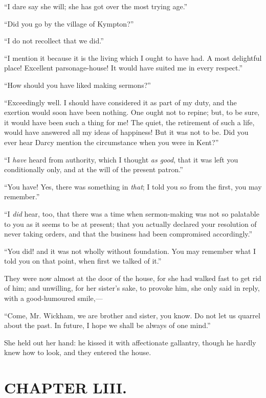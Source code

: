 ``I dare say she will; she has got over the most trying age.''

``Did you go by the village of Kympton?''

``I do not recollect that we did.''

``I mention it because it is the living which I ought to have had. A most delightful place! Excellent parsonage-house! It would have suited me in every respect.''

``How should you have liked making sermons?''

``Exceedingly well. I should have considered it as part of my duty, and the exertion would soon have been nothing. One ought not to repine; but, to be sure, it would have been such a thing for me! The quiet, the retirement of such a life, would have answered all my ideas of happiness! But it was not to be. Did you ever hear Darcy mention the circumstance when you were in Kent?''

``I \textit{have} heard from authority, which I thought \textit{as good}, that it was left you conditionally only, and at the will of the present patron.''

``You have! Yes, there was something in \textit{that}; I told you so from the first, you may remember.''

``I \textit{did} hear, too, that there was a time when sermon-making was not so palatable to you as it seems to be at present; that you actually declared your resolution of never taking orders, and that the business had been compromised accordingly.''

``You did! and it was not wholly without foundation. You may remember what I told you on that point, when first we talked of it.''

They were now almost at the door of the house, for she had walked fast to get rid of him; and unwilling, for her sister's sake, to provoke him, she only said in reply, with a good-humoured smile,---

``Come, Mr. Wickham, we are brother and sister, you know. Do not let us quarrel about the past. In future, I hope we shall be always of one mind.''

She held out her hand: he kissed it with affectionate gallantry, though he hardly knew how to look, and they entered the house.



\chapter{CHAPTER LIII.}

